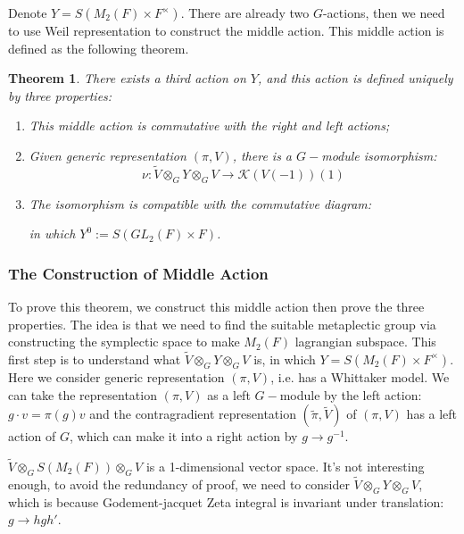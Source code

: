 \documentclass[12pt,a4paper,english]{article}
\theoremstyle{plain}
\newtheorem{thm}{Theorem}[section]
\theoremstyle{definition}
\begin{document}
Denote $Y=S(M_{2}(F)\times F^{\times})$. There are already two $G$-actions, then we need to use Weil representation to construct the middle action. This middle action is defined as the following theorem.
\begin{thm}\label{thm2.2}
There exists a third action on $Y$, and this action is defined uniquely by three properties:
\begin{enumerate}
    \item This middle action is commutative with the right and left actions;
    \item Given generic representation $(\pi, V)$, there is a $G-$module isomorphism:
    \begin{equation*}
        \nu:\tilde{V}\otimes_{G}Y\otimes_{G}V\rightarrow\mathcal{K}(V(-1))(1)
    \end{equation*}
    \item The isomorphism is compatible with the commutative diagram:
\begin{center}
\end{center}
in which $Y^{0}:=S(GL_{2}(F)\times F)$.
\end{enumerate}
\end{thm}
\subsubsection{The Construction of Middle Action}
To prove this theorem, we construct this middle action then prove the three properties. 
The idea is that we need to find the suitable metaplectic group via constructing the symplectic space to make $M_{2}(F)$ lagrangian subspace. This first step is to understand what $\tilde{V}\otimes_{G}Y\otimes_{G}V$ is, in which $Y=S(M_{2}(F)\times F^{\times})$. Here we consider generic representation $(\pi, V)$, i.e. has a Whittaker model. We can take the representation $(\pi, V)$ as a left $G-$module by the left action: $g\cdot v=\pi(g)v$ and the contragradient representation $(\tilde{\pi}, \tilde{V})$ of $(\pi, V)$ has a left action of $G$, which can make it into a right action by $g\rightarrow g^{-1}$.

 $\tilde{V}\otimes_{G}S(M_{2}(F))\otimes_{G}V$ is a 1-dimensional vector space. It's not interesting enough, to avoid the redundancy of proof, we need to consider  $\tilde{V}\otimes_{G}Y\otimes_{G}V$, which is because Godement-jacquet Zeta integral is invariant under translation: $g\rightarrow hgh'$.
\end{document}

